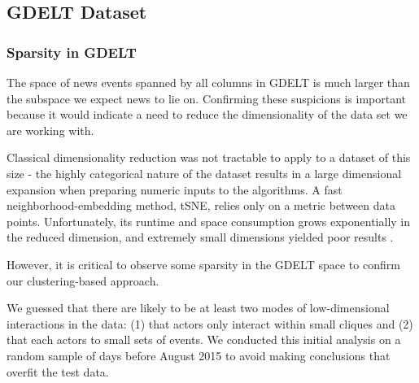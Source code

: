 
\subsection{GDELT Dataset}

\subsubsection{Sparsity in GDELT}

The space of news events spanned by all columns in GDELT is much larger than the subspace we expect news to lie on. Confirming these suspicions is important because it would indicate a need to reduce the dimensionality of the data set we are working with.

Classical dimensionality reduction was not tractable to apply to a dataset of this size - the highly categorical nature of the dataset results in a large dimensional expansion when preparing numeric inputs to the algorithms. A fast neighborhood-embedding method, tSNE, relies only on a metric between data points. Unfortunately, its runtime and space consumption grows exponentially in the reduced dimension, and extremely small dimensions yielded poor results .

However, it is critical to observe some sparsity in the GDELT space to confirm our clustering-based approach.

We guessed that there are likely to be at least two modes of low-dimensional interactions in the data: (1) that actors only interact within small cliques and (2) that each actors to small sets of events. We conducted this initial analysis on a random sample of days before August 2015 to avoid making conclusions that overfit the test data.

